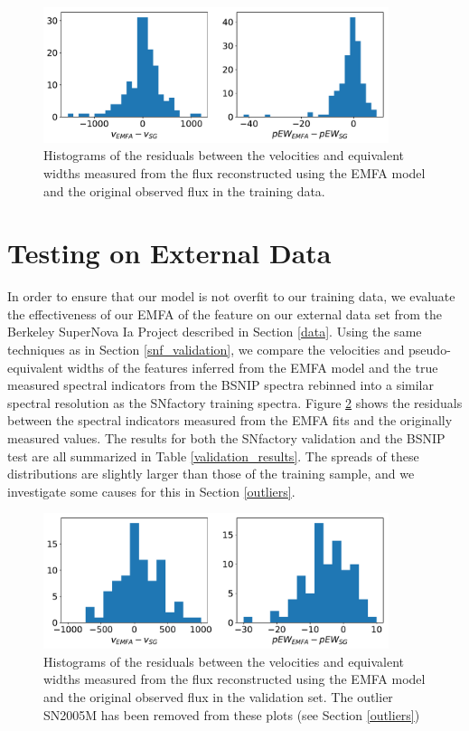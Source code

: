 \begin{figure}[htbp]
    \centering
    \includegraphics[width=0.9\textwidth]{figures/si_feat_pca/snf_recovery_resids.pdf}
    \caption{Histograms of the residuals between the velocities and equivalent widths measured from the flux reconstructed using the EMFA model and the original observed flux in the training data.}
    \label{snf_hist_resids_native_resolution}
\end{figure}

\section{Testing on External Data}
In order to ensure that our model is not overfit to our training data, we evaluate the effectiveness of our EMFA of the \siliconii{} feature on our external data set from the Berkeley SuperNova Ia Project \citep[BSNIP,][]{silverman_berkeley_2012} described in Section \ref{data}. Using the same techniques as in Section \ref{snf_validation}, we compare the velocities and pseudo-equivalent widths of the features inferred from the EMFA model and the true measured spectral indicators from the BSNIP spectra rebinned into a similar spectral resolution as the SNfactory training spectra. Figure \ref{bsnip_hist_resids} shows the residuals between the spectral indicators measured from the EMFA fits and the originally measured values. The results for both the SNfactory validation and the BSNIP test are all summarized in Table \ref{validation_results}. The spreads of these distributions are slightly larger than those of the training sample, and we investigate some causes for this in Section \ref{outliers}.

\begin{figure}[htbp]
    \centering
    \includegraphics[width=0.9\textwidth]{figures/si_feat_pca/bsnip_recovery_resids.pdf}
    \caption{Histograms of the residuals between the velocities and equivalent widths measured from the flux reconstructed using the EMFA model and the original observed flux in the validation set. The outlier SN2005M has been removed from these plots (see Section \ref{outliers})}
    \label{bsnip_hist_resids}
\end{figure}

